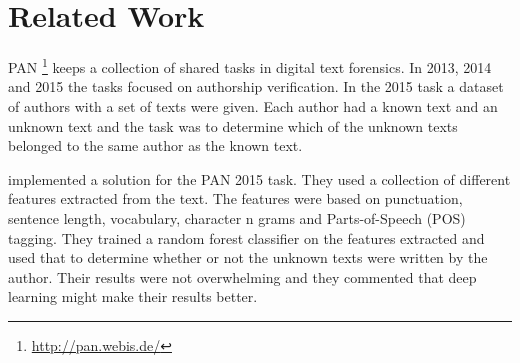 \section{Related Work}


PAN \footnote{\url{http://pan.webis.de/}} keeps a collection of shared tasks in
digital text forensics. In 2013, 2014 and 2015 the tasks focused on authorship
verification. In the 2015 task a dataset of authors with a set of texts were
given. Each author had a known text and an unknown text and the task was to
determine which of the unknown texts belonged to the same author as the known
text.



\cite{maitra2015} implemented a solution for the PAN 2015 task. They used a
collection of different features extracted from the text. The features were
based on punctuation, sentence length, vocabulary, character n grams and
Parts-of-Speech (POS) tagging. They trained a random forest classifier on the
features extracted and used that to determine whether or not the unknown texts
were written by the author. Their results were not overwhelming and they
commented that deep learning might make their results better.





